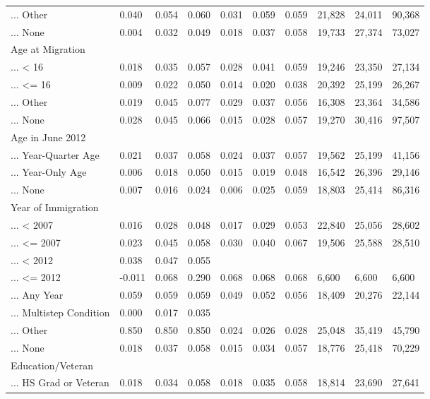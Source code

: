 \documentclass[
  letterpaper,
  DIV=11,
  numbers=noendperiod]{scrartcl}
\begin{document}
\begin{table}[!htbp]
{\begin{tabular}{llllllllll}
... Other & 0.040 & 0.054 & 0.060 & 0.031 & 0.059 & 0.059 & 21,828 & 24,011 & 90,368 \\ 
... None & 0.004 & 0.032 & 0.049 & 0.018 & 0.037 & 0.058 & 19,733 & 27,374 & 73,027 \\ 
Age at Migration &  &  &  &  &  &  &  &  &  \\ 
... < 16 & 0.018 & 0.035 & 0.057 & 0.028 & 0.041 & 0.059 & 19,246 & 23,350 & 27,134 \\ 
... <= 16 & 0.009 & 0.022 & 0.050 & 0.014 & 0.020 & 0.038 & 20,392 & 25,199 & 26,267 \\ 
... Other & 0.019 & 0.045 & 0.077 & 0.029 & 0.037 & 0.056 & 16,308 & 23,364 & 34,586 \\ 
... None & 0.028 & 0.045 & 0.066 & 0.015 & 0.028 & 0.057 & 19,270 & 30,416 & 97,507 \\ 
Age in June 2012 &  &  &  &  &  &  &  &  &  \\ 
... Year-Quarter Age & 0.021 & 0.037 & 0.058 & 0.024 & 0.037 & 0.057 & 19,562 & 25,199 & 41,156 \\ 
... Year-Only Age & 0.006 & 0.018 & 0.050 & 0.015 & 0.019 & 0.048 & 16,542 & 26,396 & 29,146 \\ 
... None & 0.007 & 0.016 & 0.024 & 0.006 & 0.025 & 0.059 & 18,803 & 25,414 & 86,316 \\ 
Year of Immigration &  &  &  &  &  &  &  &  &  \\ 
... < 2007 & 0.016 & 0.028 & 0.048 & 0.017 & 0.029 & 0.053 & 22,840 & 25,056 & 28,602 \\ 
... <= 2007 & 0.023 & 0.045 & 0.058 & 0.030 & 0.040 & 0.067 & 19,506 & 25,588 & 28,510 \\ 
... < 2012 & 0.038 & 0.047 & 0.055 &  &  &  &  &  &  \\ 
... <= 2012 & -0.011 & 0.068 & 0.290 & 0.068 & 0.068 & 0.068 & 6,600 & 6,600 & 6,600 \\ 
... Any Year & 0.059 & 0.059 & 0.059 & 0.049 & 0.052 & 0.056 & 18,409 & 20,276 & 22,144 \\ 
... Multistep Condition & 0.000 & 0.017 & 0.035 &  &  &  &  &  &  \\ 
... Other & 0.850 & 0.850 & 0.850 & 0.024 & 0.026 & 0.028 & 25,048 & 35,419 & 45,790 \\ 
... None & 0.018 & 0.037 & 0.058 & 0.015 & 0.034 & 0.057 & 18,776 & 25,418 & 70,229 \\ 
Education/Veteran &  &  &  &  &  &  &  &  &  \\ 
... HS Grad or Veteran & 0.018 & 0.034 & 0.058 & 0.018 & 0.035 & 0.058 & 18,814 & 23,690 & 27,641 \\ 

\end{tabular}}
\end{table}
\end{document}
